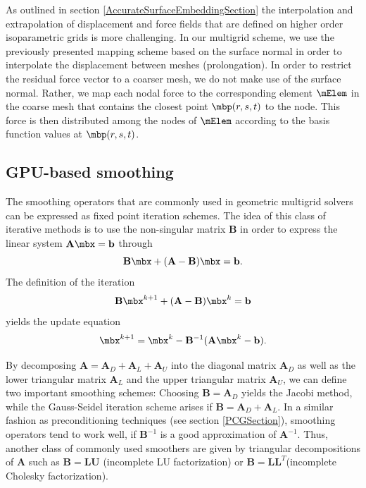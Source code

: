 As outlined in section \ref{AccurateSurfaceEmbeddingSection} the interpolation and extrapolation of displacement and force fields that are defined on higher order isoparametric grids is more challenging. In our multigrid scheme, we use the previously presented mapping scheme based on the surface normal in order to interpolate the displacement between meshes (prolongation). In order to restrict the residual force vector to a coarser mesh, we do not make use of the surface normal. Rather, we map each nodal force to the corresponding element $\mElem$ in the coarse mesh that contains the closest point $\mbp (r,s,t)$ to the node. This force is then distributed among the nodes of $\mElem$ according to the basis function values at $\mbp (r,s,t)$.


\subsection{GPU-based smoothing}
\label{GPUBasedSmoothingSection}
The smoothing operators that are commonly used in geometric multigrid solvers can be expressed as fixed point iteration schemes. The idea of this class of iterative methods is to use the non-singular matrix $\mathbf B$ in order to express the linear system $\mathbf A \mbx = \mathbf b$ through
\begin{equation}
\mathbf B \mbx  + (\mathbf A - \mathbf B) \mbx = \mathbf b.
\end{equation}
The definition of the iteration 
\begin{equation}
\mathbf B \mbx ^{k+1}  + (\mathbf A - \mathbf B) \mbx^{k} = \mathbf b
\end{equation}
yields the update equation
\begin{equation}
\mbx ^{k+1} = \mbx^{k} - \mathbf B ^{-1} (\mathbf A \mbx^{k} - \mathbf b).
\label{MultigridUpdate}
\end{equation}

By decomposing $\mathbf A = \mathbf A_D + \mathbf A_L+ \mathbf A_U$ into the diagonal matrix $\mathbf A_D$ as well as the lower triangular matrix $\mathbf A_L$ and the upper triangular matrix $\mathbf A_U$, we can define two important smoothing schemes: Choosing $\mathbf B = \mathbf A_D$ yields the Jacobi method, while the Gauss-Seidel iteration scheme arises if $\mathbf B = \mathbf A_D + \mathbf A_L$. In a similar fashion as preconditioning techniques (see section \ref{PCGSection}), smoothing operators tend to work well, if $\mathbf B ^{-1}$ is a good approximation of $\mathbf A ^{-1}$. Thus, another class of commonly used smoothers are given by triangular decompositions of $\mathbf A$ such as $\mathbf B = \mathbf L \mathbf U$ (incomplete LU factorization) or $\mathbf B = \mathbf L \mathbf L^T$(incomplete Cholesky factorization).

